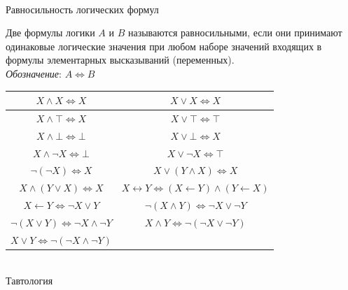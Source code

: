 \begin{frame}{\\Равносильность логических формул}
	\topline
	\\
	\footnotesize{
		Две формулы логики $A$ и $B$ называются равносильными, если они принимают одинаковые логические значения при любом наборе значений входящих в формулы элементарных высказываний (переменных).\\
		\textit{Обозначение}: $A \iff B$
		\begin{center}
			\begin{tabular}{|c|c|}
				\hline
				$X \land X \iff X$ & $X \lor X \iff X$\\
				\hline
				$X \land \top \iff X$ & $X \lor \top \iff \top$\\
				\hline
				$X \land \bot \iff \bot$ & $X \lor \bot \iff X$\\
				\hline
				$X \land \neg X \iff \bot$ & $X \lor \neg X \iff \top$\\
				\hline
				$\neg(\neg X) \iff X$ & $X \lor (Y \land X) \iff X$\\
				\hline
				$X \land (Y \lor X) \iff X$ & $X \leftrightarrow Y \iff (X \leftarrow Y) \land (Y \leftarrow X)$\\
				\hline
				$X \leftarrow Y \iff \neg X \lor Y$ & $\neg(X \land Y) \iff \neg X \lor \neg Y$\\
				\hline
				$\neg(X \lor Y) \iff \neg X \land \neg Y$ & $X \land Y \iff \neg(\neg X \lor \neg Y)$\\
				\hline
				$X \lor Y \iff \neg(\neg X \land \neg Y)$ &\\
				\hline
			\end{tabular}
		\end{center}
	}
\end{frame}

\begin{frame}{\\Тавтология}
	\topline
	\justifying
	\begin{SCn}
	\end{SCn}
\end{frame}

